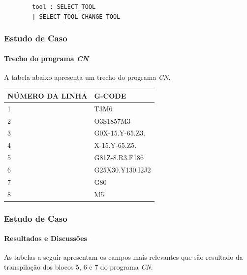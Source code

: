\documentclass[aspectratio=169]{beamer}
\begin{document}
{\begin{frame}[fragile]
\begin{itemize}
\begin{lstlisting}
        tool : SELECT_TOOL
        | SELECT_TOOL CHANGE_TOOL    
    \end{lstlisting}
  \end{itemize}

\end{frame}  


\begin{frame}[fragile]
  \frametitle{Estudo de Caso}
  \framesubtitle{Trecho do programa \emph{CN}}

  A tabela abaixo apresenta um trecho do programa \emph{CN}.

  \vspace{3mm}

  \begin{tabular}{l|l}
    \hline
    \scriptsize{\bfseries{NÚMERO DA LINHA}} & 
    \scriptsize{\bfseries{G-CODE}} \\
    \hline

    \scriptsize{1} & \scriptsize{T3M6} \\    
    \hline

    \scriptsize{2} & \scriptsize{O3S1857M3} \\
    \hline

    \scriptsize{3} & \scriptsize{G0X-15.Y-65.Z3.} \\
    \hline
      
    \scriptsize{4} & \scriptsize{X-15.Y-65.Z5.} \\
    \hline

    \scriptsize{5} & \scriptsize{G81Z-8.R3.F186} \\
    \hline

    \scriptsize{6} & \scriptsize{G25X30.Y130.I2J2} \\
    \hline

    \scriptsize{7} & \scriptsize{G80} \\
    \hline

    \scriptsize{8} & \scriptsize{M5} \\
    \hline
      
  \end{tabular}

\end{frame}  


\begin{frame}[fragile]
  \frametitle{Estudo de Caso}
  \framesubtitle{Resultados e Discussões}

  As tabelas a seguir apresentam os campos mais relevantes que são 
  resultado da transpilação dos blocos 5, 6 e 7 do programa \emph{CN}.


\end{frame}}
\end{document}
